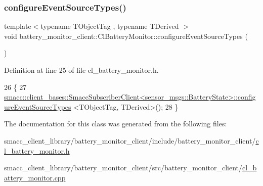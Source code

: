 \subsubsection{\texorpdfstring{configure\+Event\+Source\+Types()}{configureEventSourceTypes()}}
{\footnotesize\ttfamily template$<$typename T\+Object\+Tag , typename T\+Derived $>$ \\
void battery\+\_\+monitor\+\_\+client\+::\+Cl\+Battery\+Monitor\+::configure\+Event\+Source\+Types (\begin{DoxyParamCaption}{ }\end{DoxyParamCaption})\hspace{0.3cm}{\ttfamily [inline]}}



Definition at line 25 of file cl\+\_\+battery\+\_\+monitor.\+h.


\begin{DoxyCode}
26     \{
27         
      \hyperlink{classsmacc_1_1client__bases_1_1SmaccSubscriberClient}{smacc::client\_bases::SmaccSubscriberClient<sensor\_msgs::BatteryState>::configureEventSourceTypes}
      <TObjectTag, TDerived>();
28     \}
\end{DoxyCode}


The documentation for this class was generated from the following files\+:\begin{DoxyCompactItemize}
\item 
smacc\+\_\+client\+\_\+library/battery\+\_\+monitor\+\_\+client/include/battery\+\_\+monitor\+\_\+client/\hyperlink{cl__battery__monitor_8h}{cl\+\_\+battery\+\_\+monitor.\+h}\item 
smacc\+\_\+client\+\_\+library/battery\+\_\+monitor\+\_\+client/src/battery\+\_\+monitor\+\_\+client/\hyperlink{cl__battery__monitor_8cpp}{cl\+\_\+battery\+\_\+monitor.\+cpp}\end{DoxyCompactItemize}
